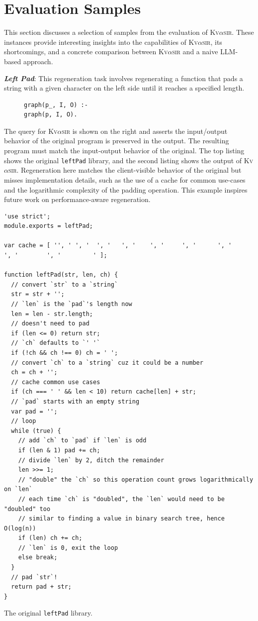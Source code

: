 \documentclass[nonacm,sigplan]{acmart}
\newcommand{\sys}{{\scshape Kv{$\alpha$}sir}\xspace}
\newcommand{\heading}[1]{\vspace{2pt}\noindent\textbf{\emph{#1}}:\enspace}
\newcommand{\ttt}[1]{\texttt{#1}\xspace}
\begin{document}



\appendix

\section{Evaluation Samples}
\label{sec:eval-samples}
This section discusses a selection of samples from the evaluation of \sys.
These instances provide interesting insights into the capabilities of \sys, its shortcomings,
and a concrete comparison between \sys and a naive LLM-based approach.

\heading{Left Pad}
This regeneration task involves regenerating a
function that pads a string with a given character on the left side until it
reaches a specified length.

\begin{figure}
\begin{verbatim}
graph(p_, I, O) :-
graph(p, I, O).
\end{verbatim}
\end{figure}
The query for \sys is shown on the right and asserts the input/output behavior of the
original program is preserved in the output.
The resulting program must match the input-output behavior of the original.
The top listing shows the original \ttt{leftPad} library, and the second listing shows the output
of \sys.
Regeneration here matches the client-visible behavior of the original but misses
implementation details, such as the use of a cache for common
use-cases and the logarithmic complexity of the padding operation.
This example inspires future work on performance-aware regeneration.

\begin{listing}[htpb]
\begin{verbatim}
'use strict';
module.exports = leftPad;

var cache = [ '', ' ', '  ', '   ', '    ', '     ', '      ', '       ', '        ', '         ' ];

function leftPad(str, len, ch) {
  // convert `str` to a `string`
  str = str + '';
  // `len` is the `pad`'s length now
  len = len - str.length;
  // doesn't need to pad
  if (len <= 0) return str;
  // `ch` defaults to `' '`
  if (!ch && ch !== 0) ch = ' ';
  // convert `ch` to a `string` cuz it could be a number
  ch = ch + '';
  // cache common use cases
  if (ch === ' ' && len < 10) return cache[len] + str;
  // `pad` starts with an empty string
  var pad = '';
  // loop
  while (true) {
    // add `ch` to `pad` if `len` is odd
    if (len & 1) pad += ch;
    // divide `len` by 2, ditch the remainder
    len >>= 1;
    // "double" the `ch` so this operation count grows logarithmically on `len`
    // each time `ch` is "doubled", the `len` would need to be "doubled" too
    // similar to finding a value in binary search tree, hence O(log(n))
    if (len) ch += ch;
    // `len` is 0, exit the loop
    else break;
  }
  // pad `str`!
  return pad + str;
}
  \end{verbatim}
\caption{The original \ttt{leftPad} library.}
\end{listing}
\end{document}
